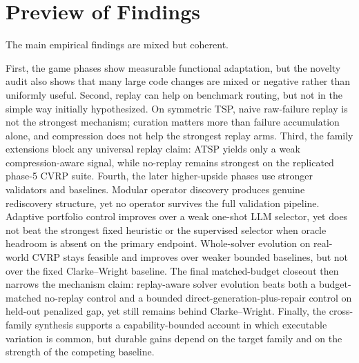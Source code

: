 \section{Preview of Findings}
\label{sec:intro-preview}

The main empirical findings are mixed but coherent.

First, the game phases show measurable functional adaptation, but the novelty audit also shows that many
large code changes are mixed or negative rather than uniformly useful. Second, replay can help on
benchmark routing, but not in the simple way initially hypothesized. On symmetric TSP, naive
raw-failure replay is not the strongest mechanism; curation matters more than failure accumulation
alone, and compression does not help the strongest replay arms. Third, the family extensions block
any universal replay claim: ATSP yields only a weak compression-aware signal, while no-replay
remains strongest on the replicated phase-5 CVRP suite. Fourth, the later higher-upside phases use
stronger validators and baselines. Modular operator discovery produces genuine rediscovery structure,
yet no operator survives the full validation pipeline. Adaptive portfolio control improves over a
weak one-shot LLM selector, yet does not beat the strongest fixed heuristic or the supervised
selector when oracle headroom is absent on the primary endpoint. Whole-solver evolution on
real-world CVRP stays feasible and improves over weaker bounded baselines, but not over the fixed
Clarke--Wright baseline. The final matched-budget closeout then narrows the mechanism claim:
replay-aware solver evolution beats both a budget-matched no-replay control and a bounded
direct-generation-plus-repair control on held-out penalized gap, yet still remains behind
Clarke--Wright. Finally, the cross-family synthesis supports a capability-bounded account in which
executable variation is common, but durable gains depend on the target family and on the strength
of the competing baseline.

